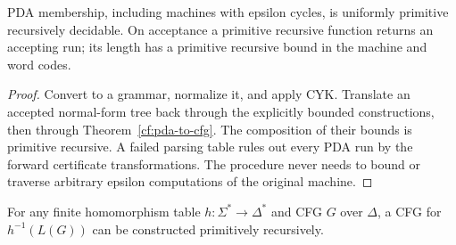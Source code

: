 \begin{corollary}
\label{cf:pda-membership}
PDA membership, including machines with epsilon cycles, is uniformly
primitive recursively decidable.  On acceptance a primitive recursive
function returns an accepting run; its length has a primitive recursive
bound in the machine and word codes.
\end{corollary}

\begin{proof}
Convert to a grammar, normalize it, and apply CYK.  Translate an accepted
normal-form tree back through the explicitly bounded constructions, then
through Theorem~\ref{cf:pda-to-cfg}.  The composition of their bounds is
primitive recursive.  A failed parsing table rules out every PDA run by
the forward certificate transformations.  The procedure never needs to
bound or traverse arbitrary epsilon computations of the original machine.
\end{proof}

\begin{theorem}
\label{cf:inverse-homomorphism}
For any finite homomorphism table $h:\Sigma^*\to\Delta^*$ and CFG $G$ over
$\Delta$, a CFG for $h^{-1}(L(G))$ can be constructed primitively recursively.
\end{theorem}

